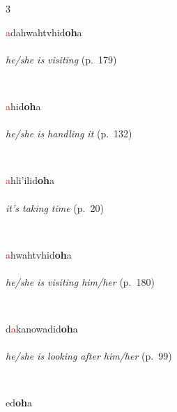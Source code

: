 \documentclass[oneside,openany]{book}%
\begin{document}
\noindent\begin{multicols}{3}%
\begin{minipage}[t]{\linewidth}
\raggedright\noindent \textcolor{Red}{a}dahwahtvhid\textbf{oh}a\\
\\
\noindent \textit{he/she is visiting} (p.~179)
\end{minipage}\\[1em]%
\begin{minipage}[t]{\linewidth}
\raggedright\noindent \textcolor{Red}{a}hid\textbf{oh}a\\
\\
\noindent \textit{he/she is handling it} (p.~132)
\end{minipage}\\[1em]%
\begin{minipage}[t]{\linewidth}
\raggedright\noindent \textcolor{Red}{a}hli'ilid\textbf{oh}a\\
\\
\noindent \textit{it's taking time} (p.~20)
\end{minipage}\\[1em]%
\begin{minipage}[t]{\linewidth}
\raggedright\noindent \textcolor{Red}{a}hwahtvhid\textbf{oh}a\\
\\
\noindent \textit{he/she is visiting him/her} (p.~180)
\end{minipage}\\[1em]%
\begin{minipage}[t]{\linewidth}
\raggedright\noindent d\textcolor{Red}{a}kanowadid\textbf{oh}a\\
\\
\noindent \textit{he/she is looking after him/her} (p.~99)
\end{minipage}\\[1em]%
\begin{minipage}[t]{\linewidth}
\raggedright\noindent ed\textbf{oh}a\\
\\

\end{minipage}
\end{multicols}
\end{document}
